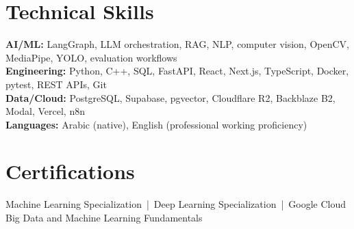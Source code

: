 \documentclass[letterpaper]{article}
\begin{document}
\section*{Technical Skills}
\textbf{AI/ML:} LangGraph, LLM orchestration, RAG, NLP, computer vision, OpenCV, MediaPipe, YOLO, evaluation workflows\\
\textbf{Engineering:} Python, C++, SQL, FastAPI, React, Next.js, TypeScript, Docker, pytest, REST APIs, Git\\
\textbf{Data/Cloud:} PostgreSQL, Supabase, pgvector, Cloudflare R2, Backblaze B2, Modal, Vercel, n8n\\
\textbf{Languages:} Arabic (native), English (professional working proficiency)

\section*{Certifications}
Machine Learning Specialization \,|\, Deep Learning Specialization \,|\, Google Cloud Big Data and Machine Learning Fundamentals
\end{document}
